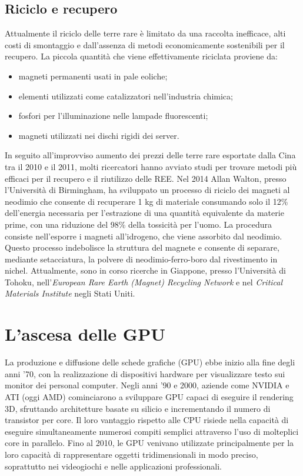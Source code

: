 \documentclass[12pt,a4paper,oneside]{book}
\begin{document}
\section{Riciclo e recupero}
Attualmente il riciclo delle terre rare è limitato da una raccolta inefficace, alti costi di smontaggio e dall'assenza di metodi economicamente sostenibili per il recupero.
La piccola quantità che viene effettivamente riciclata proviene da:
\begin{itemize}
	\item magneti permanenti usati in pale eoliche;
	\item elementi utilizzati come catalizzatori nell'industria chimica;
	\item fosfori per l'illuminazione nelle lampade fluorescenti;
	\item magneti utilizzati nei dischi rigidi dei server.
\end{itemize}

In seguito all'improvviso aumento dei prezzi delle terre rare esportate dalla Cina tra il 2010 e il 2011, molti ricercatori hanno avviato studi per trovare metodi più efficaci per il recupero e il riutilizzo delle REE.
Nel 2014 Allan Walton, presso l'Università di Birmingham, ha sviluppato un processo di riciclo dei magneti al neodimio che consente di recuperare 1 kg di materiale consumando solo il 12\% dell'energia necessaria per l'estrazione di una quantità equivalente da materie prime, con una riduzione del 98\% della tossicità per l'uomo. La procedura consiste nell'esporre i magneti all'idrogeno, che viene assorbito dal neodimio. Questo processo indebolisce la struttura del magnete e consente di separare, mediante setacciatura, la polvere di neodimio-ferro-boro dal rivestimento in nichel.
Attualmente, sono in corso ricerche in Giappone, presso l'Università di Tohoku, nell'\textit{European Rare Earth (Magnet) Recycling Network} e nel \textit{Critical Materials Institute} negli Stati Uniti.

\chapter{L'ascesa delle GPU}
La produzione e diffusione delle schede grafiche (GPU) ebbe inizio alla fine degli anni '70, con la realizzazione di dispositivi hardware per visualizzare testo sui monitor dei personal computer. Negli anni '90 e 2000, aziende come NVIDIA e ATI (oggi AMD) cominciarono a sviluppare GPU capaci di eseguire il rendering 3D, sfruttando architetture basate su silicio e incrementando il numero di transistor per core. Il loro vantaggio rispetto alle CPU risiede nella capacità di eseguire simultaneamente numerosi compiti semplici attraverso l'uso di molteplici core in parallelo. Fino al 2010, le GPU venivano utilizzate principalmente per la loro capacità di rappresentare oggetti tridimensionali in modo preciso, soprattutto nei videogiochi e nelle applicazioni professionali.
\end{document}
